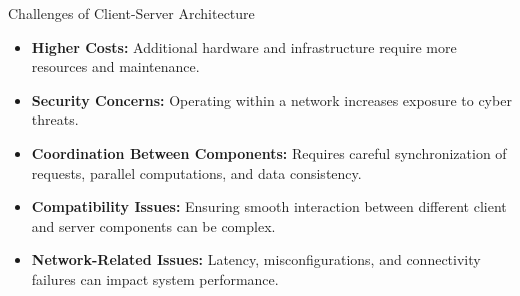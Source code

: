 \documentclass[aspectratio=169, table]{beamer}
\begin{document}
\begin{frame}{Challenges of Client-Server Architecture}
	\begin{itemize}
		\item \textbf{Higher Costs:} Additional hardware and infrastructure require more resources and maintenance.
		\item \textbf{Security Concerns:} Operating within a network increases exposure to cyber threats.
		\item \textbf{Coordination Between Components:} Requires careful synchronization of requests, parallel computations, and data consistency.
		\item \textbf{Compatibility Issues:} Ensuring smooth interaction between different client and server components can be complex.
		\item \textbf{Network-Related Issues:} Latency, misconfigurations, and connectivity failures can impact system performance.
	\end{itemize}
\end{frame}



	
	
\end{document}
